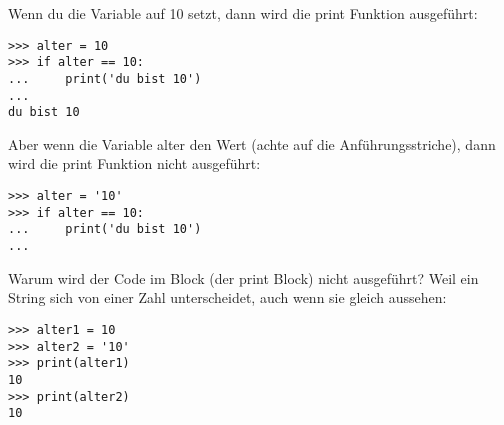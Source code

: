 Wenn du die Variable auf 10 setzt, dann wird die print Funktion ausgeführt:

\begin{Verbatim}[frame=single]
>>> alter = 10
>>> if alter == 10:
...     print('du bist 10')
...
du bist 10
\end{Verbatim}

Aber wenn die Variable alter den Wert  (achte auf die Anführungsstriche), dann wird die print Funktion nicht ausgeführt:

\begin{Verbatim}[frame=single]
>>> alter = '10'
>>> if alter == 10:
...     print('du bist 10')
...
\end{Verbatim}

Warum wird der Code im Block (der print Block) nicht ausgeführt? Weil ein String sich von einer Zahl unterscheidet, auch wenn sie gleich aussehen:

\begin{Verbatim}[frame=single]
>>> alter1 = 10
>>> alter2 = '10'
>>> print(alter1)
10
>>> print(alter2)
10
\end{Verbatim}

